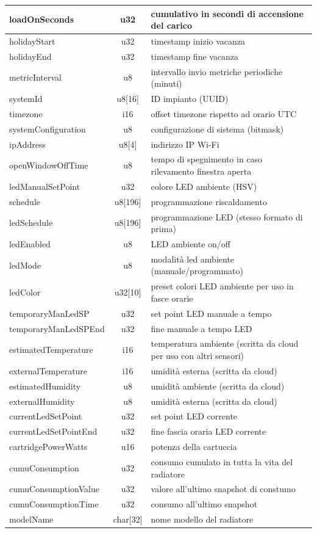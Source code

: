 \documentclass[12pt,a4paper,twoside,titlepage]{book}
\begin{document}
\begin{center}
\begin{longtable}{| p{5cm} | c | p{8cm} |}
    loadOnSeconds & u32 & cumulativo in secondi di accensione del carico\\ \hline
    holidayStart & u32 & timestamp inizio vacanza\\ \hline
    holidayEnd & u32 & timestamp fine vacanza\\ \hline
    metricInterval & u8 & intervallo invio metriche periodiche (minuti)\\ \hline
    systemId & u8[16] & ID impianto (UUID)\\ \hline
    timezone & i16 & offset timezone rispetto ad orario UTC\\ \hline
    systemConfiguration & u8 & configurazione di sistema (bitmask)\\ \hline
    ipAddress & u8[4] & indirizzo IP Wi-Fi\\ \hline
    openWindowOffTime & u8 & tempo di spegnimento in caso rilevamento finestra aperta\\ \hline
    ledManualSetPoint & u32 & colore LED ambiente (HSV)\\ \hline
    schedule & u8[196] & programmazione riscaldamento\\ \hline
    ledSchedule & u8[196] & programmazione LED (stesso formato di prima)\\ \hline
    ledEnabled & u8 & LED ambiente on/off\\ \hline
    ledMode & u8 & modalità led ambiente (manuale/programmato)\\ \hline
    ledColor & u32[10] & preset colori LED ambiente per uso in fasce orarie\\ \hline
    temporaryManLedSP & u32 & set point LED manuale a tempo\\ \hline
    temporaryManLedSPEnd & u32 & fine manuale a tempo LED\\ \hline
    estimatedTemperature & i16 &temperatura ambiente (scritta da cloud per uso con altri sensori)\\ \hline
    externalTemperature & i16 & umidità esterna (scritta da cloud)\\ \hline
    estimatedHumidity & u8 & umidità ambiente (scritta da cloud)\\ \hline
    externalHumidity & u8 & umidità esterna (scritta da cloud)\\ \hline
    currentLedSetPoint & u32 & set point LED corrente\\ \hline
    currentLedSetPointEnd & u32 & fine fascia oraria LED corrente\\ \hline
    cartridgePowerWatts & u16 & potenza della cartuccia\\ \hline
    cumuConsumption & u32 & consumo cumulato in tutta la vita del radiatore\\ \hline
    cumuConsumptionValue & u32 & valore all’ultimo snapshot di constumo\\ \hline
    cumuConsumptionTime & u32 & consumo all’ultimo snapshot\\ \hline
    modelName & char[32] & nome modello del radiatore\\ \hline
\end{longtable}
\end{center}
\end{document}
